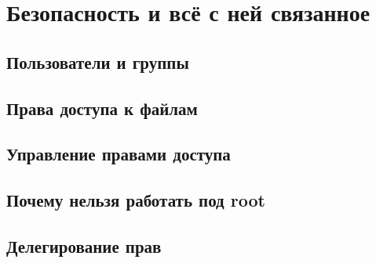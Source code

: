 \chapter{Безопасность и всё с ней связанное}
\section{Пользователи и группы}
\section{Права доступа к файлам}
\section{Управление правами доступа}
\section{Почему нельзя работать под root}
\section{Делегирование прав}
